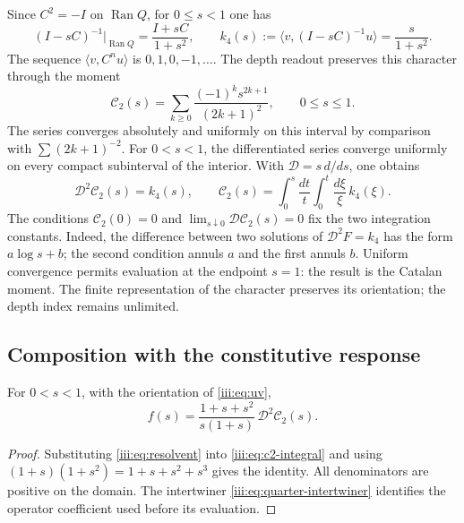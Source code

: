 Since $C^2=-I$ on $\operatorname{Ran}Q$, for $0\leq s<1$ one has
\begin{equation}
 (I-sC)^{-1}\big|_{\operatorname{Ran}Q}=\frac{I+sC}{1+s^2},
 \qquad k_4(s):=\langle v,(I-sC)^{-1}u\rangle=\frac{s}{1+s^2}.
 \label{iii:eq:resolvent}
\end{equation}
The sequence $\langle v,C^nu\rangle$ is $0,1,0,-1,\ldots$. The depth
readout preserves this character through the moment
\begin{equation}
 \mathcal C_2(s)=\sum_{k\geq0}\frac{(-1)^ks^{2k+1}}{(2k+1)^2},
 \qquad 0\leq s\leq1.
 \label{iii:eq:c2}
\end{equation}
The series converges absolutely and uniformly on this interval by
comparison with $\sum(2k+1)^{-2}$. For $0<s<1$, the differentiated series
converge uniformly on every compact subinterval of the interior. With
$\mathcal D=s\,d/ds$, one obtains
\begin{equation}
 \mathcal D^2\mathcal C_2(s)=k_4(s),\qquad
 \mathcal C_2(s)=\int_0^s\frac{dt}{t}\int_0^t\frac{d\xi}{\xi}\,k_4(\xi).
 \label{iii:eq:c2-integral}
\end{equation}
The conditions $\mathcal C_2(0)=0$ and
$\lim_{s\downarrow0}\mathcal D\mathcal C_2(s)=0$ fix the two integration
constants. Indeed, the difference between two solutions of
$\mathcal D^2F=k_4$ has the form $a\log s+b$; the second condition
annuls $a$ and the first annuls $b$.
Uniform convergence permits evaluation at the endpoint $s=1$: the result is
the Catalan moment. The finite representation of the character preserves its
orientation; the depth index remains unlimited.

\subsection{Composition with the constitutive response}

\begin{theorem}
For $0<s<1$, with the orientation of \eqref{iii:eq:uv},
\begin{equation}
 f(s)=\frac{1+s+s^2}{s(1+s)}\,\mathcal D^2\mathcal C_2(s).
 \label{iii:eq:catalan-vacuum}
\end{equation}
\end{theorem}
\begin{proof}
Substituting \eqref{iii:eq:resolvent} into \eqref{iii:eq:c2-integral} and using
$(1+s)(1+s^2)=1+s+s^2+s^3$ gives the identity. All denominators are
positive on the domain. The intertwiner \eqref{iii:eq:quarter-intertwiner}
identifies the operator coefficient used before its evaluation.
\end{proof}


